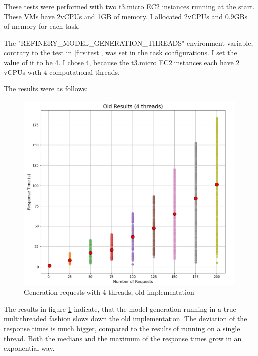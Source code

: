 				These tests were performed with two t3.micro EC2 instances running at the start. These VMs have 2vCPUs and 1GB of memory. I allocated
				2vCPUs and 0.9GBs of memory for each task. 

				The "REFINERY\_MODEL\_GENERATION\_THREADS" environment variable, contrary to the test in \ref{firsttest}, was set in the task configurations. 
				I set the value of it to be 4. I chose 4, because the t3.micro EC2 instances each have 2 vCPUs with 4 computational threads.

				The results were as follows:

				\begin{figure}[h!] 
					\begin{center}
						\includegraphics[scale=0.6]{include/imgs/4threads_old.PNG}
						\caption{Generation requests with 4 threads, old implementation}
						\label{4threadsold}	
					\end{center}
				\end{figure}

				The results in figure \ref{4threadsold} indicate, that the model generation running in a true multithreaded fashion slows down the old implementation. The 
				deviation of the response times is much bigger, compared to the results of running on a single thread. Both the medians and the maximum of the response times
				grow in an exponential way.

